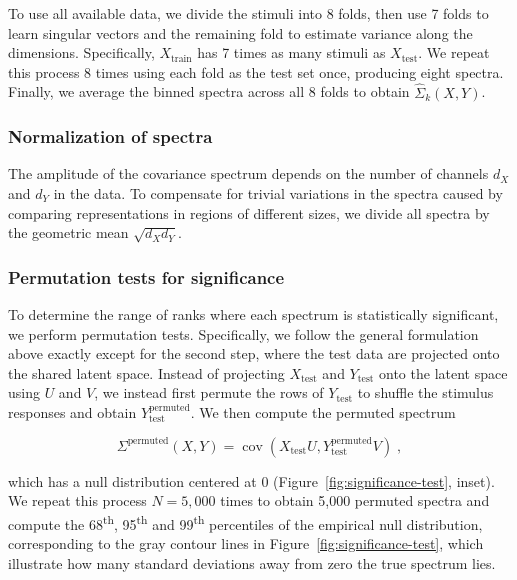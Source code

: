 \documentclass[10pt]{article}
\begin{document}
To use all available data, we divide the stimuli into 8 folds, then use 7 folds to learn singular vectors and the remaining fold to estimate variance along the dimensions. Specifically, \(X_\text{train}\) has 7 times as many stimuli as \(X_\text{test}\). We repeat this process 8 times using each fold as the test set once, producing eight spectra. Finally, we average the binned spectra across all 8 folds to obtain \(\hat{\Sigma}_k(X, Y)\).

\subsubsection{Normalization of spectra}\label{normalization-of-spectra}

The amplitude of the covariance spectrum depends on the number of channels \(d_X\) and \(d_Y\) in the data. To compensate for trivial variations in the spectra caused by comparing representations in regions of different sizes, we divide all spectra by the geometric mean \(\sqrt{d_X d_Y}\).

\subsubsection{Permutation tests for significance}\label{permutation-tests-for-significance}

To determine the range of ranks where each spectrum is statistically significant, we perform permutation tests. Specifically, we follow the general formulation above exactly except for the second step, where the test data are projected onto the shared latent space. Instead of projecting \(X_\text{test}\) and \(Y_\text{test}\) onto the latent space using \(U\) and \(V\), we instead first permute the rows of \(Y_\text{test}\) to shuffle the stimulus responses and obtain \(Y_\text{test}^\text{permuted}\). We then compute the permuted spectrum

\[
    \Sigma^\text{permuted}(X, Y) = \operatorname{cov}
    \left(X_\text{test} U, Y_\text{test}^\text{permuted} V \right)\;,
\]

which has a null distribution centered at 0 (Figure~\ref{fig:significance-test}, inset). We repeat this process \(N = 5,000\) times to obtain 5,000 permuted spectra and compute the 68\textsuperscript{th}, 95\textsuperscript{th} and 99\textsuperscript{th} percentiles of the empirical null distribution, corresponding to the gray contour lines in Figure~\ref{fig:significance-test}, which illustrate how many standard deviations away from zero the true spectrum lies.
\end{document}
